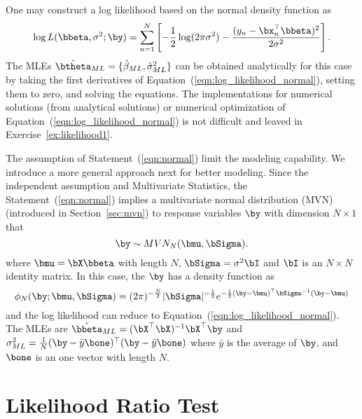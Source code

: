 One may construct a log likelihood based on the normal density function as
\begin{equation}
\log L(\bbeta, \sigma^2; \by) = \sum_{n = 1}^N
\left[
-\frac{1}{2} \log (2\pi \sigma^2) -
\frac{(y_n - \bx_n^\top\bbeta)^2}{2\sigma^2}
\right].
\label{eqn:log_likelihood_normal}
\end{equation}
The MLEs
$\hat{\btheta}_{ML} = \{\hat{\beta}_{ML}, \hat{\sigma}^2_{ML}\}$
can be obtained analytically for this case by
taking the first derivatives of Equation~(\ref{eqn:log_likelihood_normal}),
setting them to zero, and
solving the equations.
The implementations for numerical solutions (from analytical solutions)
or numerical optimization
of Equation~(\ref{eqn:log_likelihood_normal}) is not difficult
and leaved in Exercise~\ref{ex:likelihood1}.

The assumption of Statement~(\ref{eqn:normal}) limit the modeling capability.
We introduce a more general approach next for better
modeling.
Since the independent assumption and Multivariate Statistics, the
Statement~(\ref{eqn:normal})
implies a multivariate normal distribution
(MVN)
(introduced in Section~\ref{sec:mvn})
to response variables $\by$ with dimension $N\times 1$ that
\begin{equation}
\by \sim MVN_N(\bmu, \bSigma).
\label{eqn:mvn_n}
\end{equation}
where $\bmu = \bX\bbeta$ with length $N$,
$\bSigma = \sigma^2 \bI$ and $\bI$ is an $N\times N$ identity matrix.
In this case, the $\by$ has a density function as
\begin{equation*}
\displaystyle
\phi_N(\by; \bmu, \bSigma) =
(2\pi)^{-\frac{N}{2}} |\bSigma|^{-\frac{1}{2}}
e^{-\frac{1}{2} (\by - \bmu)^\top \bSigma^{-1} (\by - \bmu)}
\end{equation*}
and the log likelihood can reduce to
Equation~(\ref{eqn:log_likelihood_normal}).
The MLEs are
$\hat{\bbeta}_{ML} = (\bX^\top \bX)^{-1} \bX^\top \by$ and
$\sigma^2_{ML} = \frac{1}{N} (\by - \bar{y}\bone)^\top(\by - \bar{y}\bone)$
where $\bar{y}$ is the average of $\by$,
and $\bone$ is an one vector with length $N$.




\section{Likelihood Ratio Test}
\label{sec:lrt}

